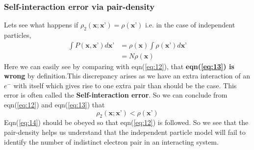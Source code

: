 \documentclass{article}
\begin{document}
\begin{Large}
\begin{flushleft}
  \subsubsection*{\Large{Self-interaction error via pair-density}}   
  Lets see what happens if $\rho_2(\textbf{x};\textbf{x'})=\rho(\textbf{x'})$ i.e. in the case of independent particles,
  \begin{equation}\label{eq:13}
  \begin{split}
  \displaystyle{\int}P(\textbf{x},\textbf{x'})d\textbf{x'} &= \rho(\textbf{x})\displaystyle{\int}\rho(\textbf{x'})d\textbf{x'}\\
  &= N\rho(\textbf{x})
  \end{split}
  \end{equation}
  Here we can easily see by comparing with eqn(\ref{eq:12}), that \textbf{eqn(\ref{eq:13}) is wrong} by definition.This discrepancy arises as we have an extra interaction of an $e^-$ with itself which gives rise to one extra pair than should be the case. This error is often called the \textbf{Self-interaction error}. So we can conclude from eqn(\ref{eq:12}) and eqn(\ref{eq:13}) that 
  \begin{equation}\label{eq:14}
  \rho_2(\textbf{x};\textbf{x'}) < \rho(\textbf{x'})
  \end{equation}
  Eqn(\ref{eq:14}) should be obeyed so that eqn(\ref{eq:12}) is followed. So we see that the pair-density helps us understand that the independent particle model will fail to identify the number of indistinct electron pair in an interacting system. 
  

\end{flushleft}
\end{Large}
\end{document}
